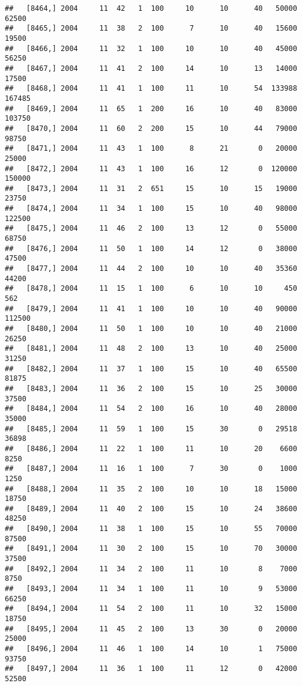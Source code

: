 \documentclass{article}\usepackage[]{graphicx}\usepackage[]{color}
\makeatletter
\newenvironment{kframe}{%
 \def\at@end@of@kframe{}%
 \ifinner\ifhmode%
  \def\at@end@of@kframe{\end{minipage}}%
  \begin{minipage}{\columnwidth}%
 \fi\fi%
 \def\FrameCommand##1{\hskip\@totalleftmargin \hskip-\fboxsep
 \colorbox{shadecolor}{##1}\hskip-\fboxsep
     \hskip-\linewidth \hskip-\@totalleftmargin \hskip\columnwidth}%
 \MakeFramed {\advance\hsize-\width
   \@totalleftmargin\z@ \linewidth\hsize
   \@setminipage}}%
 {\par\unskip\endMakeFramed%
 \at@end@of@kframe}
\newenvironment{knitrout}{}{} %
\makeatother
\begin{document}
\begin{knitrout}
\begin{kframe}
\begin{verbatim}
##   [8464,] 2004     11  42   1  100     10      10      40   50000   62500
##   [8465,] 2004     11  38   2  100      7      10      40   15600   19500
##   [8466,] 2004     11  32   1  100     10      10      40   45000   56250
##   [8467,] 2004     11  41   2  100     14      10      13   14000   17500
##   [8468,] 2004     11  41   1  100     11      10      54  133988  167485
##   [8469,] 2004     11  65   1  200     16      10      40   83000  103750
##   [8470,] 2004     11  60   2  200     15      10      44   79000   98750
##   [8471,] 2004     11  43   1  100      8      21       0   20000   25000
##   [8472,] 2004     11  43   1  100     16      12       0  120000  150000
##   [8473,] 2004     11  31   2  651     15      10      15   19000   23750
##   [8474,] 2004     11  34   1  100     15      10      40   98000  122500
##   [8475,] 2004     11  46   2  100     13      12       0   55000   68750
##   [8476,] 2004     11  50   1  100     14      12       0   38000   47500
##   [8477,] 2004     11  44   2  100     10      10      40   35360   44200
##   [8478,] 2004     11  15   1  100      6      10      10     450     562
##   [8479,] 2004     11  41   1  100     10      10      40   90000  112500
##   [8480,] 2004     11  50   1  100     10      10      40   21000   26250
##   [8481,] 2004     11  48   2  100     13      10      40   25000   31250
##   [8482,] 2004     11  37   1  100     15      10      40   65500   81875
##   [8483,] 2004     11  36   2  100     15      10      25   30000   37500
##   [8484,] 2004     11  54   2  100     16      10      40   28000   35000
##   [8485,] 2004     11  59   1  100     15      30       0   29518   36898
##   [8486,] 2004     11  22   1  100     11      10      20    6600    8250
##   [8487,] 2004     11  16   1  100      7      30       0    1000    1250
##   [8488,] 2004     11  35   2  100     10      10      18   15000   18750
##   [8489,] 2004     11  40   2  100     15      10      24   38600   48250
##   [8490,] 2004     11  38   1  100     15      10      55   70000   87500
##   [8491,] 2004     11  30   2  100     15      10      70   30000   37500
##   [8492,] 2004     11  34   2  100     11      10       8    7000    8750
##   [8493,] 2004     11  34   1  100     11      10       9   53000   66250
##   [8494,] 2004     11  54   2  100     11      10      32   15000   18750
##   [8495,] 2004     11  45   2  100     13      30       0   20000   25000
##   [8496,] 2004     11  46   1  100     14      10       1   75000   93750
##   [8497,] 2004     11  36   1  100     11      12       0   42000   52500

\end{verbatim}
\end{kframe}
\end{knitrout}
\end{document}
